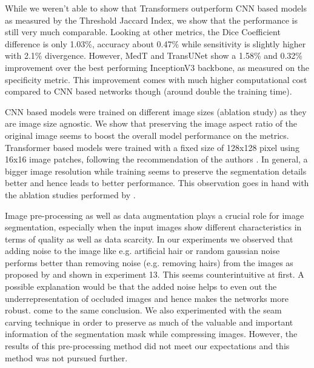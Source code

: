 \par
While we weren’t able to show that Transformers outperform CNN based models as measured by the Threshold Jaccard Index, we show that the performance is still very much comparable. Looking at other metrics, the Dice Coefficient difference is only 1.03\%, accuracy about 0.47\% while sensitivity is slightly higher with 2.1\% divergence. However, MedT and TransUNet show a 1.58\% and 0.32\% improvement over the best performing InceptionV3 backbone, as measured on the specificity metric. This improvement comes with much higher computational cost compared to CNN based networks though (around double the training time).

\par
CNN based models were trained on different image sizes (ablation study) as they are image size agnostic. We show that preserving the image aspect ratio of the original image seems to boost the overall model performance on the metrics. Transformer based models were trained with a fixed size of 128x128 pixel using 16x16 image patches, following the recommendation of the authors \citep{transunet-2021-chen, medical_transformer-2021-valanarasu}. In general, a bigger image resolution while training seems to preserve the segmentation details better and hence leads to better performance. This observation goes in hand with the ablation studies performed by \citep{transunet-2021-chen}.

\par
Image pre-processing as well as data augmentation plays a crucial role for image segmentation, especially when the input images show different characteristics in terms of quality as well as data scarcity. In our experiments we observed that adding noise to the image like e.g. artificial hair or random gaussian noise performs better than removing noise (e.g. removing hairs) from the images as proposed by \citep{data_purification-2019-bisla} and shown in experiment 13. This seems counterintuitive at first. A possible explanation would be that the added noise helps to even out the underrepresentation of occluded images and hence makes the networks more robust. \citep{skin_segmentation-2019-jahanifar} come to the same conclusion. We also experimented with the seam carving technique \citep{seam_carving-2007-shai} in order to preserve as much of the valuable and important information of the segmentation mask while compressing images. However, the results of this pre-processing method did not meet our expectations and this method was not pursued further.

